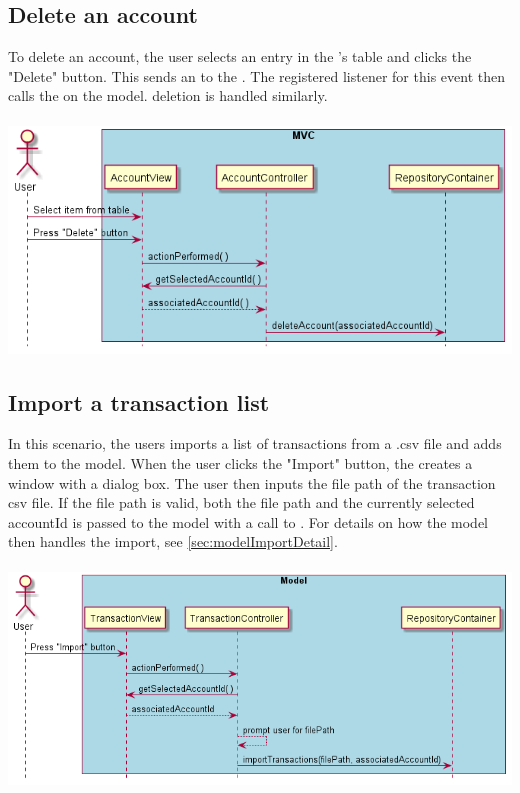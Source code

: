 \documentclass[12pt]{article}
\begin{document}
\subsection{Delete an account}
To delete an account, the user selects an entry in the 's table and clicks the "Delete" button. This sends an  to the . The registered listener for this event then calls the  on the model.  deletion is handled similarly.\\
\\
\includegraphics[width=\textwidth,height=\textheight,keepaspectratio]{diagrams/sequence/deleteAccount.png}
\bigskip

\subsection{Import a transaction list}
In this scenario, the users imports a list of transactions from a .csv file and adds them to the model. When the user clicks the "Import" button, the  creates a window with a dialog box. The user then inputs the file path of the transaction csv file. If the file path is valid, both the file path and the currently selected accountId is passed to the model with a call to . For details on how the model then handles the import, see \ref{sec:modelImportDetail}.\\
\\
\includegraphics[width=\textwidth,height=\textheight,keepaspectratio]{diagrams/sequence/importHighLevel.png}
\bigskip
\end{document}
